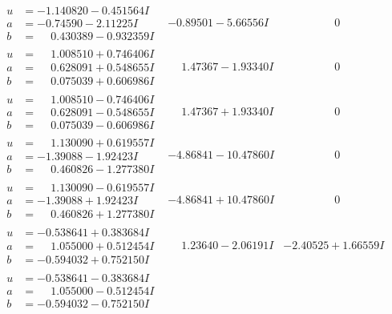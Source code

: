 \documentclass[1p]{elsarticle_modified}
\theoremstyle{definition}
\begin{document}
$$\begin{array}{c|c|c}
\begin{aligned}
u &= -1.140820 - 0.451564 I \\
a &= -0.74590 - 2.11225 I \\
b &= \phantom{-}0.430389 - 0.932359 I\end{aligned}
 & -0.89501 - 5.66556 I & \phantom{-0.000000 } 0 \\ \hline\begin{aligned}
u &= \phantom{-}1.008510 + 0.746406 I \\
a &= \phantom{-}0.628091 + 0.548655 I \\
b &= \phantom{-}0.075039 + 0.606986 I\end{aligned}
 & \phantom{-}1.47367 - 1.93340 I & \phantom{-0.000000 } 0 \\ \hline\begin{aligned}
u &= \phantom{-}1.008510 - 0.746406 I \\
a &= \phantom{-}0.628091 - 0.548655 I \\
b &= \phantom{-}0.075039 - 0.606986 I\end{aligned}
 & \phantom{-}1.47367 + 1.93340 I & \phantom{-0.000000 } 0 \\ \hline\begin{aligned}
u &= \phantom{-}1.130090 + 0.619557 I \\
a &= -1.39088 - 1.92423 I \\
b &= \phantom{-}0.460826 - 1.277380 I\end{aligned}
 & -4.86841 - 10.47860 I & \phantom{-0.000000 } 0 \\ \hline\begin{aligned}
u &= \phantom{-}1.130090 - 0.619557 I \\
a &= -1.39088 + 1.92423 I \\
b &= \phantom{-}0.460826 + 1.277380 I\end{aligned}
 & -4.86841 + 10.47860 I & \phantom{-0.000000 } 0 \\ \hline\begin{aligned}
u &= -0.538641 + 0.383684 I \\
a &= \phantom{-}1.055000 + 0.512454 I \\
b &= -0.594032 + 0.752150 I\end{aligned}
 & \phantom{-}1.23640 - 2.06191 I & -2.40525 + 1.66559 I \\ \hline\begin{aligned}
u &= -0.538641 - 0.383684 I \\
a &= \phantom{-}1.055000 - 0.512454 I \\
b &= -0.594032 - 0.752150 I\end{aligned}

\end{array}$$
\end{document}
